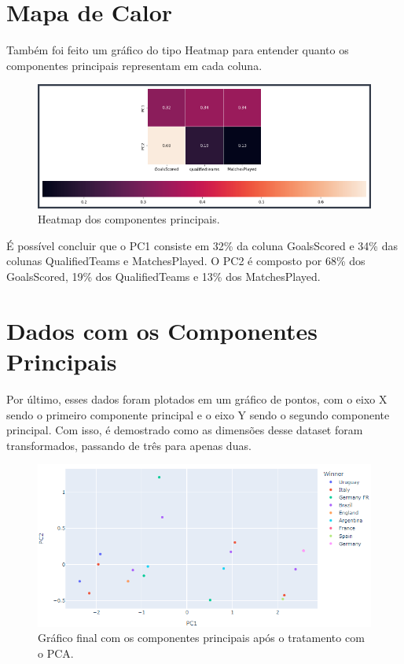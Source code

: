 \documentclass{article}
\begin{document}
\section*{Mapa de Calor}
\begin{flushleft}
    Também foi feito um gráfico do tipo Heatmap para entender quanto os componentes principais representam em cada coluna.
\end{flushleft}
\begin{figure}[h]
    \centering
    \includegraphics[scale=0.37]{mapadecalor}
    \caption{Heatmap dos componentes principais.}
    \label{fig:x cubed graph}
\end{figure}
\begin{flushleft}
    É possível concluir que o PC1 consiste em 32\% da coluna GoalsScored e 34\% das colunas QualifiedTeams e MatchesPlayed. O PC2 é composto por 68\% dos GoalsScored, 19\% dos QualifiedTeams e 13\% dos MatchesPlayed.
\end{flushleft}

\section*{Dados com os Componentes Principais}
\begin{flushleft}
    Por último, esses dados foram plotados em um gráfico de pontos, com o eixo X sendo o primeiro componente principal e o eixo Y sendo o segundo componente principal. Com isso, é demostrado como as dimensões desse dataset foram transformados, passando de três para apenas duas.
\end{flushleft}
\begin{figure}[h]
    \centering
    \includegraphics[scale=0.5]{pca}
    \caption{Gráfico final com os componentes principais após o tratamento com o PCA.}
    \label{fig:x cubed graph}
\end{figure}
\end{document}
